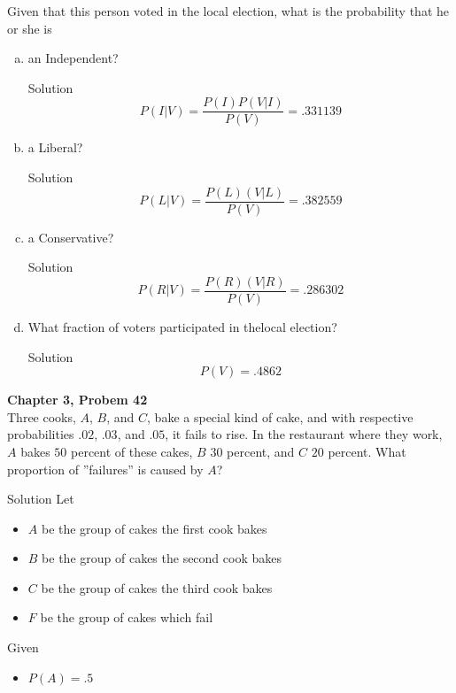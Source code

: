 \documentclass{article}
\begin{document}
\begin{spacing}{1.1}
\begin{homeworkProblem}
  Given that this person voted in the local election, what is the 
  probability that he or she is
  \begin{enumerate}[(a)]
    \item an Independent?
      \begin{homeworkSection}{Solution}
         \[P( I|V) = \frac{ P( I) P( V|I)}{ P(V)} = .331139\]
      \end{homeworkSection}
    \item a Liberal?
      \begin{homeworkSection}{Solution}
         \[P( L|V) = \frac{ P( L)( V|L)}{ P(V)} = .382559\]
      \end{homeworkSection}
    \item a Conservative?
      \begin{homeworkSection}{Solution}
         \[P( R|V) = \frac{ P( R)( V|R)}{ P(V)} = .286302\]
      \end{homeworkSection}
    \item What fraction of voters participated in thelocal election?
      \begin{homeworkSection}{Solution}
         \[P( V) = .4862\]
      \end{homeworkSection}
  \end{enumerate}
\end{homeworkProblem}
\newpage
\begin{homeworkProblem}
 {\bf Chapter 3, Probem 42}\\
  Three cooks, $A$, $B$, and $C$, bake a special kind of cake, and with 
  respective probabilities $.02$, $.03$, and $.05$, it fails to rise. 
  In the restaurant where they work, $A$ bakes $50$ percent of these cakes, 
  $B$ $30$ percent, and $C$ $20$ percent. What proportion of ''failures'' 
  is caused by $A$?
  \begin{homeworkSection}{Solution}
     Let
    \begin{itemize}
      \item $A$ be the group of cakes the first cook bakes
      \item $B$ be the group of cakes the second cook bakes
      \item $C$ be the group of cakes the third cook bakes
      \item $F$ be the group of cakes which fail
    \end{itemize}
    Given
    \begin{itemize}
      \item $P( A) = .5$

\end{itemize}
\end{homeworkSection}
\end{homeworkProblem}
\end{spacing}
\end{document}

